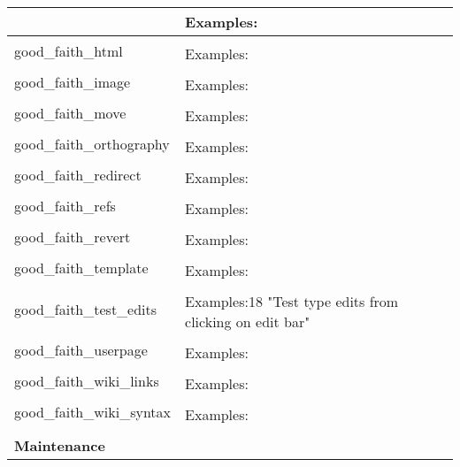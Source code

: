 \begin{longtable}{ | p{5cm} | p{9cm} | }
                                     & Examples:\\
    \hline
    \multirow{2}{*}{good\_faith\_html} & \\
                                     & Examples:\\
    \hline
    \multirow{2}{*}{good\_faith\_image} & \\
                                     & Examples:\\
    \hline
    \multirow{2}{*}{good\_faith\_move} & \\
                                     & Examples:\\
    \hline
    \multirow{2}{*}{good\_faith\_orthography} & \\
                                     & Examples:\\
    \hline
    \multirow{2}{*}{good\_faith\_redirect} & \\
                                     & Examples:\\
    \hline
    \multirow{2}{*}{good\_faith\_refs} & \\
                                     & Examples:\\
    \hline
    \multirow{2}{*}{good\_faith\_revert} & \\
                                     & Examples:\\
    \hline
    \multirow{2}{*}{good\_faith\_template} & \\
                                     & Examples:\\
    \hline
    \multirow{2}{*}{good\_faith\_test\_edits} & \\
                                     & Examples:18 "Test type edits from clicking on edit bar"\\
    \hline
    \multirow{2}{*}{good\_faith\_userpage} & \\
                                     & Examples:\\
    \hline
    \multirow{2}{*}{good\_faith\_wiki\_links} & \\
                                     & Examples:\\
    \hline
    \multirow{2}{*}{good\_faith\_wiki\_syntax} & \\
                                     & Examples:\\
    \hline
        \multicolumn{2}{|l|}{} \\
    \hline \hline
        \multicolumn{2}{|l|}{\textbf{Maintenance}} \\

\end{longtable}
